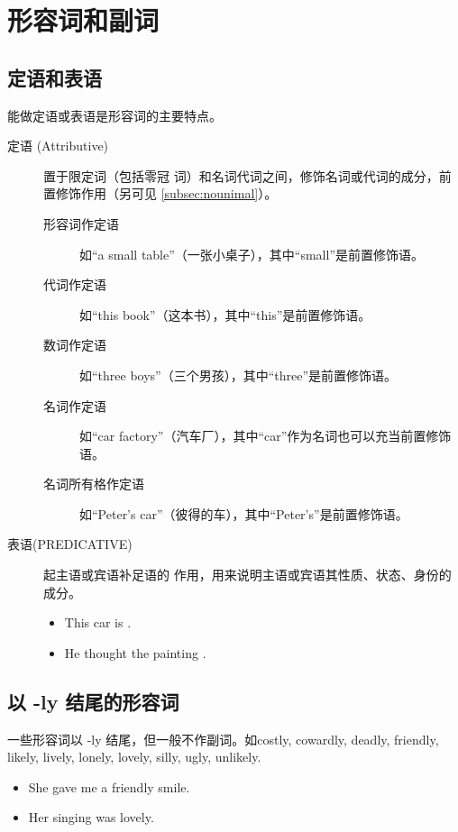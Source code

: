 \section{形容词和副词}

\subsection{定语和表语}
\label{subsec:attrpred}

能做定语或表语是形容词的主要特点。

\begin{description}
\item[定语 (Attributive)]  置于限定词（包括零冠
  词）和名词代词之间，修饰名词或代词的成分，前置修饰作用（另可见 \cref{subsec:nounimal}）。
  \begin{description}
    \item[形容词作定语] 如“a small table”（一张小桌子），其中“small”是前置修饰语。
    \item[代词作定语] 如“this book”（这本书），其中“this”是前置修饰语。
    \item[数词作定语] 如“three boys”（三个男孩），其中“three”是前置修饰语。
    \item[名词作定语] 如“car factory”（汽车厂），其中“car”作为名词也可以充当前置修饰语。
    \item[名词所有格作定语] 如“Peter’s car”（彼得的车），其中“Peter’s”是前置修饰语。
  \end{description}

\item[表语(PREDICATIVE)]  起主语或宾语补足语的
  作用，用来说明主语或宾语其性质、状态、身份的成分。
  \begin{itemize}
  \item This car is .

  \item He thought the painting .
  \end{itemize}
\end{description}

\subsection{以 -ly 结尾的形容词}

一些形容词以 -ly 结尾，但一般不作副词。如costly, cowardly, deadly, friendly,
likely, lively, lonely, lovely, silly, ugly, unlikely.
\begin{itemize}
\item She gave me a friendly smile.

\item Her singing was lovely.
\end{itemize}

